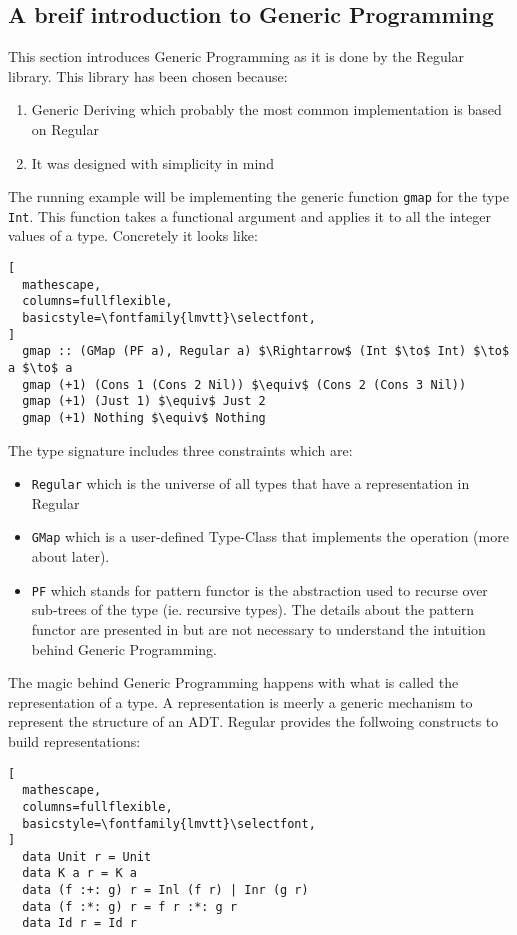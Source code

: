 \documentclass[8pt]{extarticle}
\begin{document}
\subsection{A breif introduction to Generic Programming}
This section introduces Generic Programming as it is done by the Regular\cite{Reglar} library. This library has been chosen because:
\begin{enumerate}
\item Generic Deriving which probably the most common implementation is based on Regular
\item It was designed with simplicity in mind
\end{enumerate}
The running example will be implementing the generic function \verb+gmap+ for the type \verb+Int+. This function takes a functional argument and applies it to all the integer values of a type. Concretely it looks like:
\begin{lstlisting}[
  mathescape,
  columns=fullflexible,
  basicstyle=\fontfamily{lmvtt}\selectfont,
]
  gmap :: (GMap (PF a), Regular a) $\Rightarrow$ (Int $\to$ Int) $\to$ a $\to$ a
  gmap (+1) (Cons 1 (Cons 2 Nil)) $\equiv$ (Cons 2 (Cons 3 Nil))
  gmap (+1) (Just 1) $\equiv$ Just 2
  gmap (+1) Nothing $\equiv$ Nothing
\end{lstlisting}
The type signature includes three constraints which are:
\begin{itemize}
\item \verb+Regular+ which is the universe of all types that have a representation in Regular
\item \verb+GMap+ which is a user-defined Type-Class that implements the operation (more about later).
\item \verb+PF+ which stands for pattern functor is the abstraction used to recurse over sub-trees of the type (ie. recursive types). The details about the pattern functor are presented in \cite{Regular} but are not necessary to understand the intuition behind Generic Programming.
\end{itemize}
The magic behind Generic Programming happens with what is called the representation of a type. A representation is meerly a generic mechanism to represent the structure of an ADT. Regular provides the follwoing constructs to build representations:
\begin{lstlisting}[
  mathescape,
  columns=fullflexible,
  basicstyle=\fontfamily{lmvtt}\selectfont,
]
  data Unit r = Unit
  data K a r = K a
  data (f :+: g) r = Inl (f r) | Inr (g r)
  data (f :*: g) r = f r :*: g r
  data Id r = Id r
\end{lstlisting}
\end{document}
